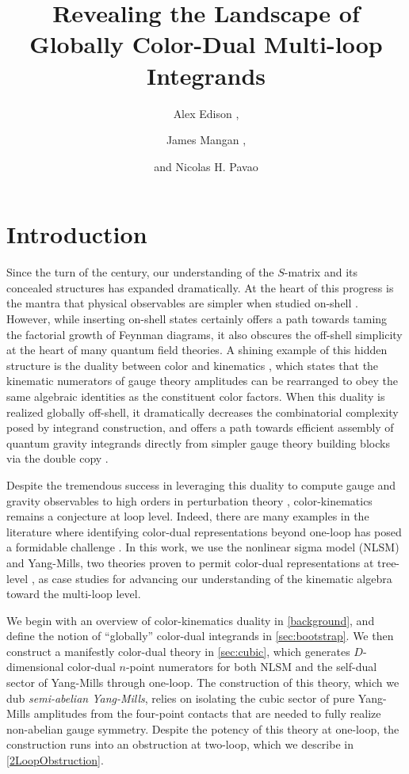 \documentclass[11pt,letter]{article}
\author{\large Alex Edison \orcidlink{0000-0002-5430-9500},}
\author{\large James Mangan  \orcidlink{0000-0002-9713-7446},}
\author{\large and Nicolas H. Pavao \orcidlink{0000-0002-9817-8266}}
\affiliation{Department of Physics and Astronomy, Northwestern
  University, Evanston, Illinois 60208, USA}
\title{\center  \fontsize{18}{20} \selectfont  Revealing the Landscape of Globally Color-Dual Multi-loop Integrands}
\begin{document}
\maketitle
\flushbottom
 

\section{Introduction}\label{intro}
Since the turn of the century, our understanding of the $S$-matrix and
its concealed structures has expanded dramatically. At the heart of this
progress is the mantra that physical observables are simpler when
studied on-shell
\cite{Parke:1986gb,TasiLance,Cheung:2017pzi}. However, while inserting on-shell states certainly offers a path towards taming the
factorial growth of Feynman diagrams, it also obscures the off-shell
simplicity at the heart of many quantum field theories. A shining
example of this hidden structure is the duality between color and
kinematics \cite{BCJ,Bern:2010ue,BCJreview}, which states that the
kinematic numerators of gauge theory amplitudes can be rearranged to
obey the same algebraic identities as the constituent color
factors. When this duality is realized globally off-shell, it
dramatically decreases the combinatorial complexity posed by integrand
construction, and offers a path towards efficient assembly of quantum
gravity integrands directly from simpler gauge theory building blocks
via the double copy \cite{BCJ,Bern:2010ue}.

Despite the tremendous success in leveraging this duality to
compute gauge and gravity observables to high orders in perturbation
theory \cite{FiveLoopN4, GeneralizedDoubleCopyFiveLoops, Bern:2018jmv,
  Carrasco:2021otn}, color-kinematics remains a conjecture at loop
level. Indeed, there are many examples in the literature where
identifying color-dual representations beyond one-loop has posed a
formidable challenge
\cite{Mogull:2015adi, Johansson:2017bfl, KalinN2TwoLoop, Bern:2015ooa}. In this work, we use
the nonlinear sigma model (NLSM) and Yang-Mills, two theories proven
to permit color-dual representations at tree-level
\cite{Feng:2010my,Cachazo:2014xea}, as case studies for advancing our
understanding of the kinematic algebra toward the multi-loop level.

We begin with an overview of color-kinematics duality in
\cref{background}, and define the notion of ``globally'' color-dual integrands in \cref{sec:bootstrap}. 
We then construct a manifestly color-dual theory in
\cref{sec:cubic}, which generates $D$-dimensional color-dual $n$-point
numerators for both NLSM and the self-dual sector of Yang-Mills
through one-loop. The construction of this theory, which we dub
\textit{semi-abelian Yang-Mills}, relies on isolating the cubic sector
of pure Yang-Mills amplitudes from the four-point contacts that are
needed to fully realize non-abelian gauge symmetry. Despite the
potency of this theory at one-loop, the construction runs into an
obstruction at two-loop, which we describe in \cref{2LoopObstruction}.
\end{document}
